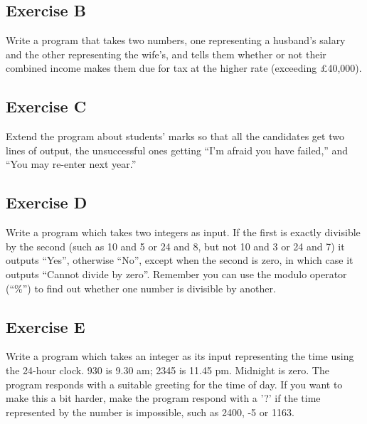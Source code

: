
\subsection*{Exercise B}

Write a program that takes two numbers, one representing a
husband's salary and the other representing the wife's, and tells them
whether or not their combined income makes them due for tax at the higher rate
(exceeding \pounds 40,000).

\subsection*{Exercise C}

Extend the program about students' marks so that all the candidates
get two lines of output, the unsuccessful ones getting ``I'm afraid you
have failed,'' and ``You may re-enter next year.''

\subsection*{Exercise D}

Write a program which takes two integers as input.
If the first is exactly divisible
by the second (such as 10 and 5 or 24 and 8, but not 10 and 3 or 24 and 7)
it outputs ``Yes'', otherwise ``No'', except when the second
is zero, in which case it outputs ``Cannot divide by zero''. Remember
you can use the modulo operator (``\%'') to find out whether one
number is divisible by another. 

\subsection*{Exercise E}

Write a program which takes an integer as its input representing the time
using the 24-hour clock.  930 is 9.30 am; 2345 is 11.45 pm.  Midnight is
zero. The program responds with a suitable greeting for the time of day.
If you want to make this a bit harder, make the program respond with a '?'
if the time represented by the number is impossible, such as 2400, -5 or
1163.




